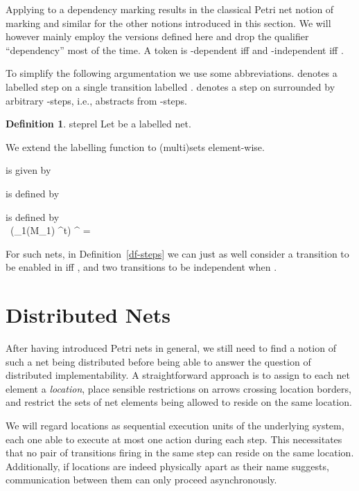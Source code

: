 \documentclass[submission,copyright,creativecommons]{eptcs}
\theoremstyle{definition}
\newtheorem{definition}{Definition}
\def\pr{\textrm{\upshape{pr}}}
\def\precond#1{{\vphantom{#1}}^\bullet #1}
\def\postcond#1{{#1}^\bullet}
\def\trail#1{\text{~#1}}
\def\defitem#1{\emph{#1}}
\def\definitionname{Definition}
\newcommand{\refdf}[1]{\definitionname~\ref{df-#1}}
\begin{document}
\noindent
Applying  to a dependency marking results in the classical Petri net
notion of marking and similar for the other notions introduced in this section.
We will however mainly employ the versions defined here and drop the qualifier
``dependency'' most of the time.
A token  is -dependent iff  and -independent
iff .

To simplify the following argumentation we use some abbreviations.
 denotes a labelled step on a single transition labelled
.  denotes a step on  surrounded by arbitrary
-steps, i.e.,  abstracts from -steps.

\begin{definition}{steprel}{
  Let  be a labelled net.
  }
  \vspace{-3ex}
    \item  We extend the labelling function  to (multi)sets element-wise.
    \item 
      is given by\\ 
    \item 
      is defined by\\ 
    \item  is defined by\\
      \
  (\pr_1(M_1) \setminus \precond{t}) \cap \postcond{t} = \varnothing \trail{.}
\vspace{1pt}

For such nets, in \refdf{steps} we can just as well consider a
transition  to be enabled in  iff , and
two transitions to be independent when .

\section{Distributed Nets}\label{sec-distr}

After having introduced Petri nets in general, we still need to find a
notion of such a net being distributed before being able to answer the
question of distributed implementability. A straightforward approach is
to assign to each net element a \defitem{location}, place sensible restrictions
on arrows crossing location borders, and restrict the sets of net elements being
allowed to reside on the same location.

We will regard locations as sequential execution units of the
underlying system, each one able to execute at most one action during each step. This
necessitates that no pair of transitions firing in the same step can reside on
the same location. Additionally, if locations are indeed physically apart as
their name suggests, communication between them can only proceed asynchronously.


\end{definition}
\end{document}
